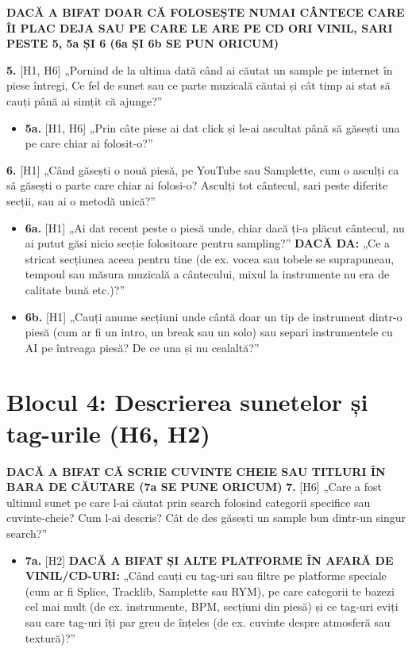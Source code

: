 \documentclass[12pt,a4paper]{report}
\newcommand{\cond}[1]{\textcolor{condition}{\textbf{#1}}}
\begin{document}
\begin{otherlanguage}{romanian}
\cond{DACĂ A BIFAT DOAR CĂ FOLOSEȘTE NUMAI CÂNTECE CARE ÎI PLAC DEJA SAU PE CARE LE ARE PE CD ORI VINIL, SARI PESTE 5, 5a ȘI 6 (6a ȘI 6b SE PUN ORICUM)}

\textbf{5.} [H1, H6] „Pornind de la ultima dată când ai căutat un sample pe internet în piese întregi, Ce fel de sunet sau ce parte muzicală căutai și cât timp ai stat să cauți până ai simțit că ajunge?”

\begin{itemize}
  \item \textbf{5a.} [H1, H6] „Prin câte piese ai dat click și le-ai ascultat până să găsești una pe care chiar ai folosit-o?”
\end{itemize}

\textbf{6.} [H1] „Când găsești o nouă piesă, pe YouTube sau Samplette, cum o asculți ca să găsești o parte care chiar ai folosi-o? Asculți tot cântecul, sari peste diferite secții, sau ai o metodă unică?”

\begin{itemize}
  \item \textbf{6a.} [H1] „Ai dat recent peste o piesă unde, chiar dacă ți-a plăcut cântecul, nu ai putut găsi nicio secție folositoare pentru sampling?” \cond{DACĂ DA:} „Ce a stricat secțiunea aceea pentru tine (de ex. vocea sau tobele se suprapuneau, tempoul sau măsura muzicală a cântecului, mixul la instrumente nu era de calitate bună etc.)?”
  \item \textbf{6b.} [H1] „Cauți anume secțiuni unde cântă doar un tip de instrument dintr-o piesă (cum ar fi un intro, un break sau un solo) sau separi instrumentele cu AI pe întreaga piesă? De ce una și nu cealaltă?”
\end{itemize}

\section{Blocul 4: Descrierea sunetelor și tag-urile (H6, H2)}

\cond{DACĂ A BIFAT CĂ SCRIE CUVINTE CHEIE SAU TITLURI ÎN BARA DE CĂUTARE (7a SE PUNE ORICUM)} \textbf{7.} [H6] „Care a fost ultimul sunet pe care l-ai căutat prin search folosind categorii specifice sau cuvinte-cheie? Cum l-ai descris? Cât de des găsești un sample bun dintr-un singur search?”

\begin{itemize}
  \item \textbf{7a.} [H2] \cond{DACĂ A BIFAT ȘI ALTE PLATFORME ÎN AFARĂ DE VINIL/CD-URI:} „Când cauți cu tag-uri sau filtre pe platforme speciale (cum ar fi Splice, Tracklib, Samplette sau RYM), pe care categorii te bazezi cel mai mult (de ex. instrumente, BPM, secțiuni din piesă) și ce tag-uri eviți sau care tag-uri îți par greu de înțeles (de ex. cuvinte despre atmosferă sau textură)?”
\end{itemize}


\end{otherlanguage}
\end{document}
